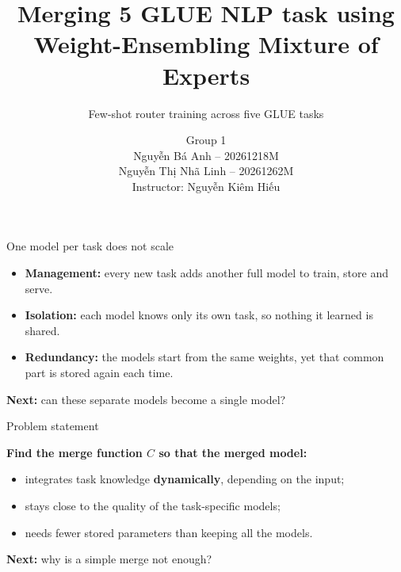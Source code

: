 \documentclass[aspectratio=169,10pt]{beamer}
\title[WEMoE for NLP]{Merging 5 GLUE NLP task using\texorpdfstring{\\}{ }Weight-Ensembling Mixture of Experts}
\subtitle{Few-shot router training across five GLUE tasks}
\author[Group 1]{Group 1\texorpdfstring{\\[2pt]}{ }{\small Nguyễn Bá Anh -- 20261218M\\ Nguyễn Thị Nhã Linh -- 20261262M}\texorpdfstring{\\[2pt]}{ }{\small\textcolor{blue!55!black}{Instructor: Nguyễn Kiêm Hiếu}}}
\institute{}
\date{}
\newcommand{\nextq}[1]{\vfill\raggedright{\small\color{hustmain}\textbf{Next:} #1}}
\begin{document}
\begin{frame}[plain]
  \titlepage
\end{frame}

\begin{frame}{One model per task does not scale}
  \centering
  \vfill
  \raggedright
  \begin{itemize}
    \item \textbf{Management:} every new task adds another full model to train, store and serve.
    \item \textbf{Isolation:} each model knows only its own task, so nothing it learned is shared.
    \item \textbf{Redundancy:} the models start from the same weights, yet that common part is stored again each time.
  \end{itemize}
  \nextq{can these separate models become a single model?}
\end{frame}

\begin{frame}{Problem statement}
  \centering
  \vfill
  \raggedright
  \textbf{Find the merge function $C$ so that the merged model:}
  \begin{itemize}
    \item integrates task knowledge \textbf{dynamically}, depending on the input;
    \item stays close to the quality of the task-specific models;
    \item needs fewer stored parameters than keeping all the models.
  \end{itemize}
  \nextq{why is a simple merge not enough?}
\end{frame}
\end{document}
